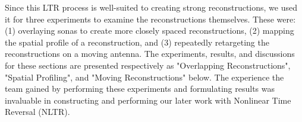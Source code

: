 Since this LTR process is well-suited to creating strong reconstructions, we used it for three experiments to examine the reconstructions themselves. These were: (1) overlaying sonas to create more closely spaced reconstructions, (2) mapping the spatial profile of a reconstruction, and (3) repeatedly retargeting the reconstructions on a moving antenna. The experiments, results, and discussions for these sections are presented respectively as "Overlapping Reconstructions", "Spatial Profiling", and "Moving Reconstructions" below. The experience the team gained by performing these experiments and formulating results was invaluable in constructing and performing our later work with Nonlinear Time Reversal (NLTR).

